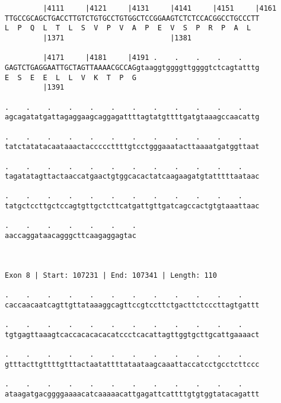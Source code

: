 \documentclass{article}
\begin{document}
\begin{Verbatim}
         |4111     |4121     |4131     |4141     |4151     |4161
TTGCCGCAGCTGACCTTGTCTGTGCCTGTGGCTCCGGAAGTCTCTCCACGGCCTGCCCTT
L  P  Q  L  T  L  S  V  P  V  A  P  E  V  S  P  R  P  A  L  
         |1371                         |1381                
  
         |4171     |4181     |4191 .    .    .    .    .    
GAGTCTGAGGAATTGCTAGTTAAAACGCCAGgtaaggtggggttggggtctcagtatttg
E  S  E  E  L  L  V  K  T  P  G                             
         |1391                                              
  
.    .    .    .    .    .    .    .    .    .    .    .    
agcagatatgattagaggaagcaggagattttagtatgttttgatgtaaagccaacattg
                                                            
.    .    .    .    .    .    .    .    .    .    .    .    
tatctatatacaataaactacccccttttgtcctgggaaatacttaaaatgatggttaat
                                                            
.    .    .    .    .    .    .    .    .    .    .    .    
tagatatagttactaaccatgaactgtggcacactatcaagaagatgtatttttaataac
                                                            
.    .    .    .    .    .    .    .    .    .    .    .    
tatgctccttgctccagtgttgctcttcatgattgttgatcagccactgtgtaaattaac
                                                            
.    .    .    .    .    .    .
aaccaggataacagggcttcaagaggagtac
                               
                               
 
Exon 8 | Start: 107231 | End: 107341 | Length: 110
 
.    .    .    .    .    .    .    .    .    .    .    .    
caccaacaatcagttgttataaaggcagttccgtccttctgacttctcccttagtgattt
                                                            
.    .    .    .    .    .    .    .    .    .    .    .    
tgtgagttaaagtcaccacacacacatccctcacattagttggtgcttgcattgaaaact
                                                            
.    .    .    .    .    .    .    .    .    .    .    .    
gtttacttgttttgtttactaatattttataataagcaaattaccatcctgcctcttccc
                                                            
.    .    .    .    .    .    .    .    .    .    .    .    
ataagatgacggggaaaacatcaaaaacattgagattcattttgtgtggtatacagattt
                                                            

\end{Verbatim}
\end{document}
